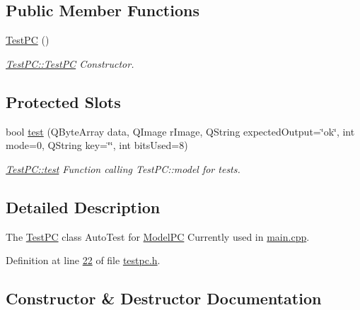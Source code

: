 \subsection*{Public Member Functions}
\begin{DoxyCompactItemize}
\item 
\mbox{\hyperlink{class_test_p_c_a65226eb54f1ff76639c9fb1e2013e430}{Test\+PC}} ()
\begin{DoxyCompactList}\small\item\em \mbox{\hyperlink{class_test_p_c_a65226eb54f1ff76639c9fb1e2013e430}{Test\+P\+C\+::\+Test\+PC}} Constructor. \end{DoxyCompactList}\end{DoxyCompactItemize}
\subsection*{Protected Slots}
\begin{DoxyCompactItemize}
\item 
bool \mbox{\hyperlink{class_test_p_c_a612a0409006417c6f03e1749bca0d45a}{test}} (Q\+Byte\+Array data, Q\+Image r\+Image, Q\+String expected\+Output=\char`\"{}ok\char`\"{}, int mode=0, Q\+String key=\char`\"{}\char`\"{}, int bits\+Used=8)
\begin{DoxyCompactList}\small\item\em \mbox{\hyperlink{class_test_p_c_a612a0409006417c6f03e1749bca0d45a}{Test\+P\+C\+::test}} Function calling Test\+P\+C\+::model for tests. \end{DoxyCompactList}\end{DoxyCompactItemize}


\subsection{Detailed Description}
The \mbox{\hyperlink{class_test_p_c}{Test\+PC}} class Auto\+Test for \mbox{\hyperlink{class_model_p_c}{Model\+PC}} Currently used in \mbox{\hyperlink{main_8cpp}{main.\+cpp}}. 

Definition at line \mbox{\hyperlink{testpc_8h_source_l00022}{22}} of file \mbox{\hyperlink{testpc_8h_source}{testpc.\+h}}.



\subsection{Constructor \& Destructor Documentation}
\mbox{\label{class_test_p_c_a65226eb54f1ff76639c9fb1e2013e430}} 
